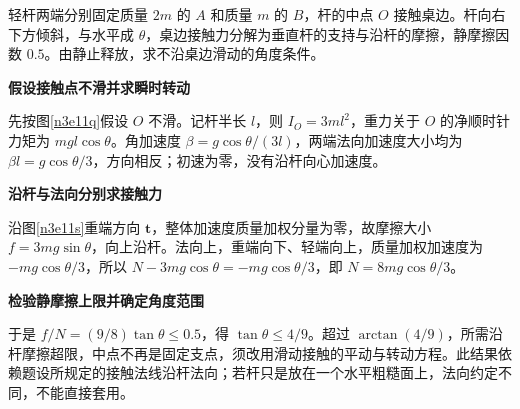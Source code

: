 \begin{question}\begin{example}[桌边支承轻杆的滑动临界]\label{n3e11}
轻杆两端分别固定质量 $2m$ 的 $A$ 和质量 $m$ 的 $B$，杆的中点 $O$ 接触桌边。杆向右下方倾斜，与水平成 $\theta$，桌边接触力分解为垂直杆的支持与沿杆的摩擦，静摩擦因数 $0.5$。由静止释放，求不沿桌边滑动的角度条件。
\end{example}\end{question}
\begin{solution}\textbf{假设接触点不滑并求瞬时转动}\par\nobreak
先按图\ref{n3e11q}假设 $O$ 不滑。记杆半长 $l$，则 $I_O=3ml^2$，重力关于 $O$ 的净顺时针力矩为 $mgl\cos\theta$。角加速度 $\beta=g\cos\theta/(3l)$，两端法向加速度大小均为 $\beta l=g\cos\theta/3$，方向相反；初速为零，没有沿杆向心加速度。


\par\medskip{}\noindent\textbf{沿杆与法向分别求接触力}\par\nobreak
沿图\ref{n3e11s}重端方向 $\bm t$，整体加速度质量加权分量为零，故摩擦大小 $f=3mg\sin\theta$，向上沿杆。法向上，重端向下、轻端向上，质量加权加速度为 $-mg\cos\theta/3$，所以 $N-3mg\cos\theta=-mg\cos\theta/3$，即 $N=8mg\cos\theta/3$。



\par\medskip{}\noindent\textbf{检验静摩擦上限并确定角度范围}\par\nobreak
于是 $f/N=(9/8)\tan\theta\le0.5$，得 $\tan\theta\le4/9$。超过 $\arctan(4/9)$，所需沿杆摩擦超限，中点不再是固定支点，须改用滑动接触的平动与转动方程。此结果依赖题设所规定的接触法线沿杆法向；若杆只是放在一个水平粗糙面上，法向约定不同，不能直接套用。
\end{solution}

